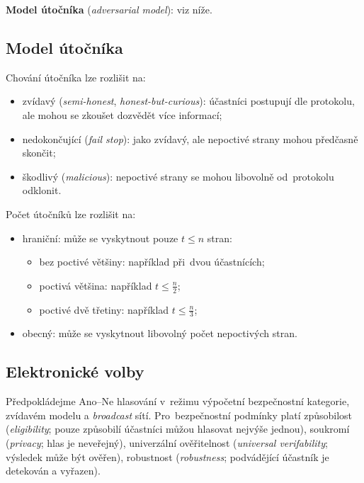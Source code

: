 \textbf{Model útočníka} (\emph{adversarial model}): viz níže.

\subsection{Model útočníka}

Chování útočníka lze rozlišit na:
\begin{itemize}
\item zvídavý (\emph{semi-honest}, \emph{honest-but-curious}): účastníci postupují dle protokolu, ale mohou se zkoušet dozvědět více informací;
\item nedokončující (\emph{fail stop}): jako zvídavý, ale nepoctivé strany mohou předčasně skončit;
\item škodlivý (\emph{malicious}): nepoctivé strany se mohou libovolně od~protokolu odklonit.
\end{itemize}

Počet útočníků lze rozlišit na:
\begin{itemize}
\item hraniční: může se vyskytnout pouze $t \le n$ stran:
    \begin{itemize}
    \item bez poctivé většiny: například při~dvou účastnících;
    \item poctivá většina: například $t \le \frac{n}{2}$;
    \item poctivé dvě třetiny: například $t \le \frac{n}{3}$;
    \end{itemize}
\item obecný: může se vyskytnout libovolný počet nepoctivých stran.
\end{itemize}

\subsection{Elektronické volby}

Předpokládejme Ano--Ne hlasování v~režimu výpočetní bezpečnostní kategorie, zvídavém modelu a \emph{broadcast} sítí.
Pro~bezpečnostní podmínky platí způsobilost (\emph{eligibility}; pouze způsobilí účastníci můžou hlasovat nejvýše jednou), soukromí (\emph{privacy}; hlas je neveřejný), univerzální ověřitelnost (\emph{universal verifability}; výsledek může být ověřen), robustnost (\emph{robustness}; podvádějící účastník je detekován a vyřazen).

